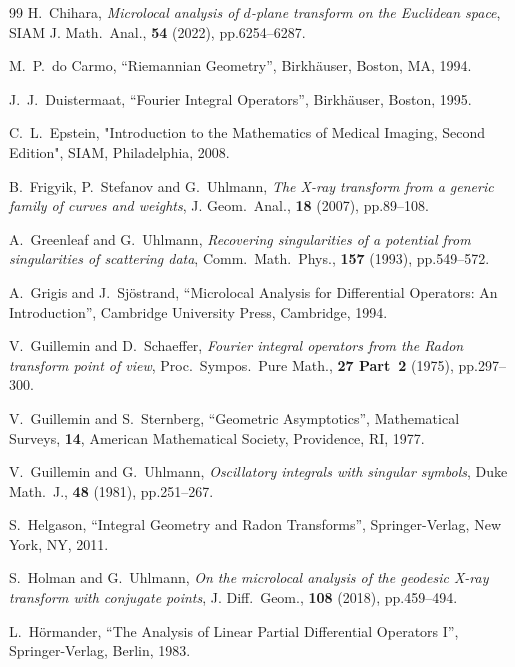 \documentclass[a4paper,11pt,reqno]{amsart}
\numberwithin{equation}{section}
\theoremstyle{definition}
\theoremstyle{remark}
\begin{document}
%
%
%
%
%
%
\begin{thebibliography}{99}
H.~Chihara, 
{\it Microlocal analysis of $d$-plane transform on the Euclidean space}, 
SIAM J. Math.\ Anal., {\bf 54} (2022), pp.6254--6287.

M.~P.~do Carmo, 
``Riemannian Geometry'', 
Birkh\"auser, Boston, MA, 1994. 

J.~J.~Duistermaat, 
``Fourier Integral Operators'', 
Birkh\"auser, Boston, 1995.

C.~L.~Epstein, 
"Introduction to the Mathematics of Medical Imaging, Second Edition", 
SIAM, Philadelphia, 2008. 

B.~Frigyik, P.~Stefanov and G.~Uhlmann, 
{\it The X-ray transform from a generic family of curves and weights}, 
J. Geom.\ Anal., {\bf 18} (2007), pp.89--108.

A.~Greenleaf and G.~Uhlmann, 
{\it Recovering singularities of a potential from singularities of scattering data}, 
Comm.\ Math.\ Phys., {\bf 157} (1993), pp.549--572.

A.~Grigis and J.~Sj\"ostrand, 
``Microlocal Analysis for Differential Operators: An Introduction'', 
Cambridge University Press, Cambridge, 1994.

V.~Guillemin and D.~Schaeffer, 
{\it Fourier integral operators from the Radon transform point of view}, 
Proc.\ Sympos.\ Pure Math., {\bf 27 Part~2} (1975), pp.297--300. 

V.~Guillemin and S.~Sternberg, 
``Geometric Asymptotics'', 
Mathematical Surveys, {\bf 14}, 
American Mathematical Society, 
Providence, RI, 1977. 

V.~Guillemin and G.~Uhlmann, 
{\it Oscillatory integrals with singular symbols}, 
Duke Math.\ J., {\bf 48} (1981), pp.251--267. 

S.~Helgason, 
``Integral Geometry and Radon Transforms'', 
Springer-Verlag, New York, NY, 2011.

S.~Holman and G.~Uhlmann, 
{\it On the microlocal analysis of the geodesic X-ray transform with conjugate points}, 
J. Diff.\ Geom., {\bf 108} (2018), pp.459--494.

L.~H\"ormander, 
``The Analysis of Linear Partial Differential Operators I'', 
Springer-Verlag, Berlin, 1983. 


\end{thebibliography}
\end{document}
